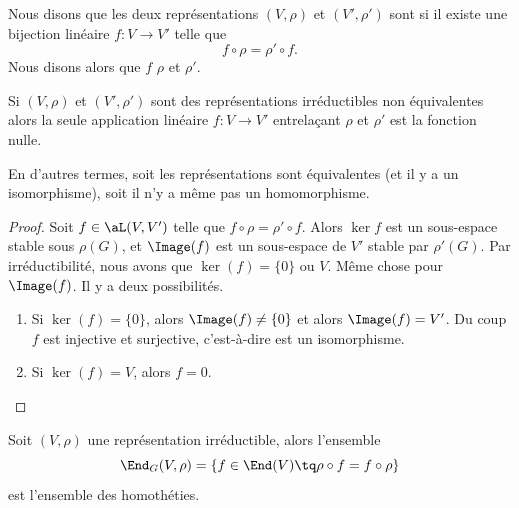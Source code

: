 \begin{definition}
	Nous disons que les deux représentations \( (V,\rho)\) et \( (V',\rho')\) sont  si il existe une bijection linéaire \( f\colon V\to V'\) telle que
	\begin{equation}
		f\circ \rho=\rho'\circ f.
	\end{equation}
	Nous disons alors que \( f\)  \( \rho\) et \( \rho'\).
\end{definition}

\begin{theorem}    \label{ThoyftobH}
	Si \( (V,\rho)\) et \( (V',\rho')\) sont des représentations irréductibles non équivalentes alors la seule application linéaire \( f\colon V\to V'\) entrelaçant \( \rho\) et \( \rho'\) est la fonction nulle.

	En d'autres termes, soit les représentations sont équivalentes (et il y a un isomorphisme), soit il n'y a même pas un homomorphisme.
\end{theorem}

\begin{proof}
	Soit \( f\in\aL(V,V')\) telle que \( f\circ \rho=\rho'\circ f\). Alors \( \ker f\) est un sous-espace stable sous \( \rho(G)\), et \( \Image(f)\) est un sous-espace de \( V'\) stable par \( \rho'(G)\). Par irréductibilité, nous avons que \( \ker(f)=\{ 0 \}\) ou \( V\). Même chose pour \( \Image(f)\). Il y a deux possibilités.
	\begin{enumerate}
		\item
		      Si \( \ker(f)=\{ 0 \}\), alors \( \Image(f)\neq \{ 0 \}\) et alors \( \Image(f)=V'\). Du coup \( f\) est injective et surjective, c'est-à-dire est un isomorphisme.
		\item
		      Si \( \ker(f)=V\), alors \( f=0\).
	\end{enumerate}
\end{proof}

\begin{corollary}
	Soit \( (V,\rho)\) une représentation irréductible, alors l'ensemble
	\begin{equation}
		\End_{G}(V,\rho)=\{ f\in\End(V)\tq \rho\circ f=f\circ \rho \}
	\end{equation}
	est l'ensemble des homothéties.
\end{corollary}

